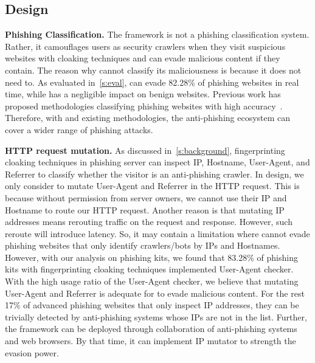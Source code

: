 \subsection{\spartacus Design}

\noindent
\textbf{Phishing Classification.}
The \spartacus framework is not a phishing classification system.
Rather, it camouflages users as security crawlers when they visit suspicious websites with cloaking techniques and can evade malicious content if they contain.
The reason why \spartacus cannot classify its maliciousness is because it does not need to.
As evaluated in~\autoref{s:eval}, \spartacus can evade 82.28\% of phishing websites in real time, while has a negligible impact on benign websites.
Previous work has proposed methodologies classifying phishing websites with high accuracy~\cite{whittaker2010large, lin2021phishpedia}.
Therefore, with \spartacus and existing methodologies, the anti-phishing ecosystem can cover a wider range of phishing attacks.


\noindent
\textbf{HTTP request mutation.}
As discussed in~\autoref{s:background}, fingerprinting cloaking techniques in phishing server can inspect IP, Hostname, User-Agent, and Referrer to classify whether the visitor is an anti-phishing crawler.
In \spartacus design, we only consider to mutate User-Agent and Referrer in the HTTP request.
This is because without permission from server owners, we cannot use their IP and Hostname to route our HTTP request.
Another reason is that mutating IP addresses means rerouting traffic on the request and response.
However, such reroute will introduce latency.
So, it may contain a limitation where \spartacus cannot evade phishing websites that only identify crawlers/bots by IPs and Hostnames.
However, with our analysis on phishing kits, we found that 83.28\% of phishing kits with fingerprinting cloaking techniques implemented User-Agent checker.
With the high usage ratio of the User-Agent checker, we believe that mutating User-Agent and Referrer is adequate for \spartacus to evade malicious content.
For the rest 17\% of advanced phishing websites that only inspect IP addresses, they can be trivially detected by anti-phishing systems whose IPs are not in the list.
Further, the \spartacus framework can be deployed through collaboration of anti-phishing systems and web browsers.
By that time, it can implement IP mutator to strength the evasion power.

